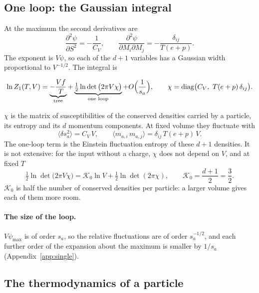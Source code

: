 \documentclass[11pt,aps,preprint,nofootinbib,superscriptaddress,tightenlines]{revtex4-2}
\newcommand{\avg}[1]{\langle #1\rangle}
\def\st{\begin{equation}}
\def\stp{\end{equation}}
\def\App#1{Appendix~\ref{#1}}
\let\oldparagraph\paragraph
\renewcommand{\paragraph}{\par\bigskip\oldparagraph}
\begin{document}
\subsection{One loop: the Gaussian integral}
\label{sec:oneloop}

At the maximum the second derivatives are
\st
\frac{\partial^2\psi}{\partial S^2}=-\frac1{C_V},\qquad \frac{\partial^2\psi}{\partial M_i\partial M_j}=-\frac{\delta_{ij}}{T(e+p)} .
\stp
The exponent is $V\psi$, so each of the $d+1$ variables has a Gaussian width proportional to $V^{-1/2}$.  The integral is
\begin{keyeq}
\st
\ln Z_1(T,V)=\underbrace{-\frac{V f}T}_{\text{tree}}+\underbrace{\tfrac12\ln\det\big(2\pi V\chi\big)}_{\text{one loop}}+O\Big(\frac1{s_a}\Big),
\qquad \chi={\rm diag}\big(C_V,\ T(e+p)\,\delta_{ij}\big) .
\label{lnZ1}
\stp
\end{keyeq}
$\chi$ is the matrix of susceptibilities of the conserved densities carried by a particle, its entropy and its $d$ momentum components.  At fixed
volume they fluctuate with
\st
\avg{\delta s_a^2}=C_V\,V,\qquad \avg{m_{a,i}\,m_{a,j}}=\delta_{ij}\,T(e+p)\,V .
\label{intrinsic}
\stp
The one-loop term is the Einstein fluctuation entropy of these $d+1$ densities.  It is not extensive: for the input without a charge, $\chi$ does not
depend on $V$, and at fixed $T$
\st
\tfrac12\ln\det\big(2\pi V\chi\big)=\mathcal K_0\ln V+\tfrac12\ln\det(2\pi\chi),\qquad \mathcal K_0=\frac{d+1}2=\frac32 .
\stp
$\mathcal K_0$ is half the number of conserved densities per particle: a larger volume gives each of them more room.

\paragraph{The size of the loop.}  $V\psi_{\max}$ is of order $s_a$, so the relative fluctuations are of order $s_a^{-1/2}$, and each further order of the
expansion about the maximum is smaller by $1/s_a$ (\App{app:single}).

\subsection{The thermodynamics of a particle}
\label{sec:particlethermo}
\end{document}
